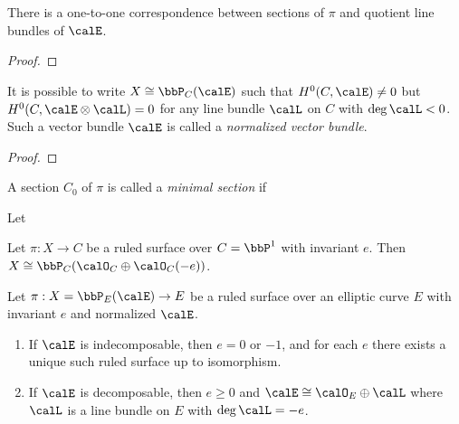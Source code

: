     \begin{lemma}\label{lem:correspondence_between_sections_and_quotient_line_bundles}
        There is a one-to-one correspondence between sections of \(\pi\) and quotient line bundles of \(\calE\).
    \end{lemma}
    \begin{proof}
        
    \end{proof}

    \begin{lemma}\label{lem:existence_of_normalized_vector_bundle}
        It is possible to write \(X \cong \bbP_C(\calE)\) such that \(H^0(C,\calE) \neq 0\) but \(H^0(C,\calE \otimes \calL) = 0\) for any line bundle \(\calL\) on \(C\) with \(\deg \calL < 0\).
        Such a vector bundle \(\calE\) is called a \emph{normalized vector bundle}.
    \end{lemma}
    \begin{proof}
        
    \end{proof}

    \begin{definition}\label{def:minimal_section_of_ruled_surface}
        A section \(C_0\) of \(\pi\) is called a \emph{minimal section} if 
    \end{definition}

    \begin{theorem}\label{thm:restriction_of_e}
        Let
        
    \end{theorem}

    \begin{theorem}\label{thm:classification_of_ruled_surface_on_P1}
        Let \(\pi:X \to C\) be a ruled surface over \(C = \bbP^1\) with invariant \(e\).
        Then \(X \cong \bbP_{C}(\calO_C \oplus \calO_C(-e))\).
    \end{theorem}

    \begin{theorem}\label{thm:classification_of_ruled_surface_on_elliptic_curve}
        Let \(\pi:X = \bbP_E(\calE) \to E\) be a ruled surface over an elliptic curve \(E\) with invariant \(e\) and normalized \(\calE\). 
        \begin{enumerate}
            \item If \(\calE\) is indecomposable, then \(e = 0\) or \(-1\), and for each \(e\) there exists a unique such ruled surface up to isomorphism.
            \item If \(\calE\) is decomposable, then \(e \geq 0\) and \(\calE \cong \calO_E \oplus \calL\) where \(\calL\) is a line bundle on \(E\) with \(\deg \calL = -e\).
        \end{enumerate}
    \end{theorem}


